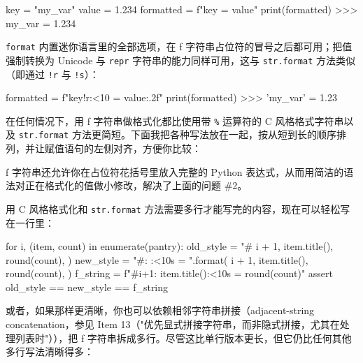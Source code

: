 \begin{codebox}[python]
key = "my_var"
value = 1.234
formatted = f"{key} = {value}"
print(formatted)
>>>
my_var = 1.234
\end{codebox}

\texttt{format} 内置迷你语言里的全部选项，在 f 字符串占位符的冒号之后都可用；把值强制转换为 Unicode 与 \texttt{repr} 字符串的能力同样可用，这与 \texttt{str.format} 方法类似（即通过 \texttt{!r} 与 \texttt{!s}）：

\begin{codebox}[python]
formatted = f"{key!r:<10} = {value:.2f}"
print(formatted)
>>>
'my_var'   = 1.23
\end{codebox}

在任何情况下，用 f 字符串做格式化都比使用带 \texttt{\%} 运算符的 C 风格格式字符串以及 \texttt{str.format} 方法更简短。下面我把各种写法放在一起，按从短到长的顺序排列，并让赋值语句的左侧对齐，方便你比较：


f 字符串还允许你在占位符花括号里放入完整的 Python 表达式，从而用简洁的语法对正在格式化的值做小修改，解决了上面的问题 \#2。

用 C 风格格式化和 \texttt{str.format} 方法需要多行才能写完的内容，现在可以轻松写在一行里：

\begin{codebox}[python]
for i, (item, count) in enumerate(pantry):
    old_style = "#%
        i + 1,
        item.title(),
        round(count),
    )
    new_style = "#{}: {:<10s} = {}".format(
        i + 1,
        item.title(),
        round(count),
    )
    f_string = f"#{i+1}: {item.title():<10s} = {round(count)}"
    assert old_style == new_style == f_string
\end{codebox}

或者，如果那样更清晰，你也可以依赖相邻字符串拼接（adjacent-string concatenation，参见 Item 13（"优先显式拼接字符串，而非隐式拼接，尤其在处理列表时"）），把 f 字符串拆成多行。尽管这比单行版本更长，但它仍比任何其他多行写法清晰得多：


